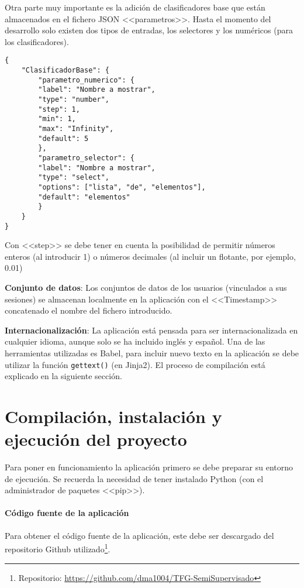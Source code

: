 Otra parte muy importante es la adición de clasificadores base que están
almacenados en el fichero JSON <<parametros>>. Hasta el momento del desarrollo
solo existen dos tipos de entradas, los selectores y los numéricos (para los
clasificadores).

\begin{tcolorbox}[colback=cyan!5!white,colframe=cyan!75!black,title=Estructura para añadir clasificadores y sus parámetros]
\begin{verbatim}
{
    "ClasificadorBase": {
        "parametro_numerico": {
        "label": "Nombre a mostrar",
        "type": "number",
        "step": 1,
        "min": 1,
        "max": "Infinity",
        "default": 5
        },
        "parametro_selector": {
        "label": "Nombre a mostrar",
        "type": "select",
        "options": ["lista", "de", "elementos"],
        "default": "elementos"
        }
    }
}
\end{verbatim}
\end{tcolorbox}

Con <<step>> se debe tener en cuenta la posibilidad de permitir números enteros
(al introducir 1) o números decimales (al incluir un flotante, por ejemplo, 0.01)

\textbf{Conjunto de datos}: Los conjuntos de datos de los usuarios (vinculados a
sus sesiones) se almacenan localmente en la aplicación con el <<Timestamp>>
concatenado el nombre del fichero introducido.

\textbf{Internacionalización}: La aplicación está pensada para ser
internacionalizada en cualquier idioma, aunque solo se ha incluido inglés y
español. Una de las herramientas utilizadas es Babel, para incluir nuevo texto
en la aplicación se debe utilizar la función \texttt{gettext()} (en Jinja2). El
proceso de compilación está explicado en la siguiente sección.

\clearpage
\section{Compilación, instalación y ejecución del proyecto}

Para poner en funcionamiento la aplicación primero se debe preparar su entorno
de ejecución. Se recuerda la necesidad de tener instalado Python (con el administrador de
paquetes <<pip>>).

\paragraph{Código fuente de la aplicación} Para obtener el código fuente de la
aplicación, este debe ser descargado del repositorio Github utilizado\footnote{
Repositorio: \url{https://github.com/dma1004/TFG-SemiSupervisado}}.

